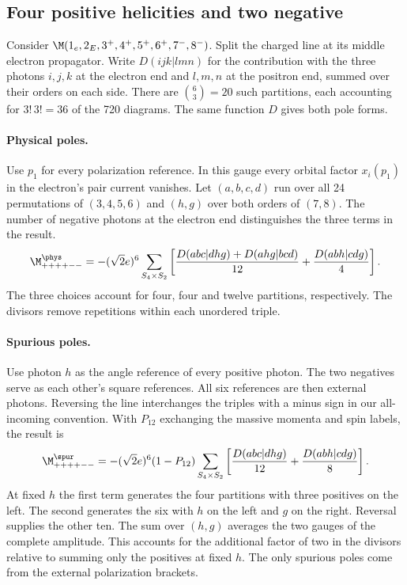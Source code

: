 \subsection{Four positive helicities and two negative}\label{sec:eight-two-minus}

Consider $\M(1_e,2_E,3^+,4^+,5^+,6^+,7^-,8^-)$. Split the charged
line at its middle electron propagator. Write $D(ijk|lmn)$ for the
contribution with the three photons $i,j,k$ at the electron end and
$l,m,n$ at the positron end, summed over their orders on each side.
There are $\binom{6}{3}=20$ such partitions, each accounting for
$3!\,3!=36$ of the 720 diagrams. The same function $D$ gives both
pole forms.

\paragraph{Physical poles.}
Use $p_1$ for every polarization reference. In this gauge every orbital
factor $x_i(p_1)$ in the electron's pair current vanishes. Let
$(a,b,c,d)$ run over all 24 permutations of $(3,4,5,6)$ and $(h,g)$
over both orders of $(7,8)$. The number of negative photons at the
electron end distinguishes the three terms in the result.
\begin{equation}\label{eq:eight-two-physical}
 \M^{\phys}_{++++--}=-(\sqrt{2}e)^6\sum_{S_4\times S_2}
 \left[\frac{D(abc|dhg)+D(ahg|bcd)}{12}
       +\frac{D(abh|cdg)}{4}\right].
\end{equation}
The three choices account for four, four and twelve partitions,
respectively. The divisors remove repetitions within each unordered triple.

\paragraph{Spurious poles.}
Use photon $h$ as the angle reference of every positive photon. The
two negatives serve as each other's square references. All six
references are then external photons. Reversing the line interchanges
the triples with a minus sign in our all-incoming convention. With
$P_{12}$ exchanging the massive momenta and spin labels, the result is
\begin{equation}\label{eq:eight-two-spurious}
 \M^{\spur}_{++++--}=-(\sqrt{2}e)^6(1-P_{12})\sum_{S_4\times S_2}
 \left[\frac{D(abc|dhg)}{12}+\frac{D(abh|cdg)}{8}\right].
\end{equation}
At fixed $h$ the first term generates the four partitions with three
positives on the left. The second generates the six with $h$ on the
left and $g$ on the right. Reversal supplies the other ten. The sum
over $(h,g)$ averages the two gauges of the complete amplitude. This
accounts for the additional factor of two in the divisors relative to
summing only the positives at fixed $h$. The only spurious poles come
from the external polarization brackets.


